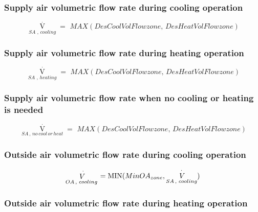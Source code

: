 \subsubsection{Supply air volumetric flow rate during cooling operation}\label{supply-air-volumetric-flow-rate-during-cooling-operation}

\begin{equation}
{\mathop V\limits^ \cdot_{SA\,\,,\,cooling}} = \,\,MAX(DesCoolVolFlowzone,\,DesHeatVolFlowzone)
\end{equation}

\subsubsection{Supply air volumetric flow rate during heating operation}\label{supply-air-volumetric-flow-rate-during-heating-operation}

\begin{equation}
{\mathop V\limits^ \cdot_{SA\,\,,\,heating}} = \,\,MAX(DesCoolVolFlowzone,\,DesHeatVolFlowzone)
\end{equation}

\subsubsection{Supply air volumetric flow rate when no cooling or heating is needed}\label{supply-air-volumetric-flow-rate-when-no-cooling-or-heating-is-needed}

\begin{equation}
{\mathop V\limits^ \cdot_{SA\,,\,no\,cool\,or\,heat}} = \,\,MAX(DesCoolVolFlowzone,\,DesHeatVolFlowzone)
\end{equation}

\subsubsection{Outside air volumetric flow rate during cooling operation}\label{outside-air-volumetric-flow-rate-during-cooling-operation}

\begin{equation}
{\mathop V\limits^ \cdot_{OA\,,\,\,cooling}} = {\rm{MIN}}(MinO{A_{zone}},{\mathop {\,V}\limits^ \cdot_{SA\,,\,\,cooling}})
\end{equation}

\subsubsection{Outside air volumetric flow rate during heating operation}\label{outside-air-volumetric-flow-rate-during-heating-operation}

